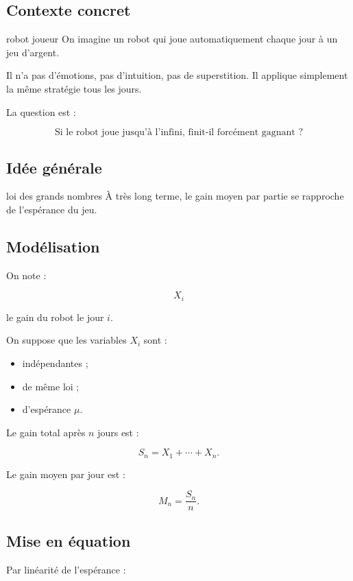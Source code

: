 \documentclass[11pt,a4paper]{article}
\begin{document}
\subsection{Contexte concret}

\begin{contexte}{robot joueur}
On imagine un robot qui joue automatiquement chaque jour à un jeu d'argent.

Il n'a pas d'émotions, pas d'intuition, pas de superstition. Il applique simplement la même stratégie tous les jours.

La question est :

\[
\text{Si le robot joue jusqu'à l'infini, finit-il forcément gagnant ?}
\]
\end{contexte}

\subsection{Idée générale}

\begin{idee}{loi des grands nombres}
À très long terme, le gain moyen par partie se rapproche de l'espérance du jeu.
\end{idee}

\subsection{Modélisation}

On note :

\[
X_i
\]

le gain du robot le jour $i$.

On suppose que les variables $X_i$ sont :
\begin{itemize}
    \item indépendantes ;
    \item de même loi ;
    \item d'espérance $\mu$.
\end{itemize}

Le gain total après $n$ jours est :

\[
S_n=X_1+\cdots+X_n.
\]

Le gain moyen par jour est :

\[
M_n=\frac{S_n}{n}.
\]

\subsection{Mise en équation}

Par linéarité de l'espérance :
\end{document}
